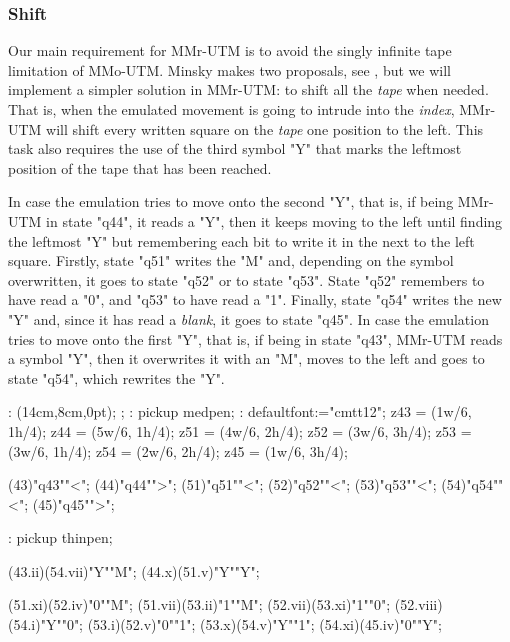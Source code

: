 \subsubsection{Shift}

Our main requirement for MMr-UTM is to avoid the
singly infinite tape limitation of MMo-UTM.
Minsky makes two proposals, see ,
but we will implement a simpler solution in MMr-UTM:
to shift all the {\em tape} when needed.
That is, when the emulated movement is going to intrude into
the {\em index}, MMr-UTM will shift every written square
on the {\em tape} one position to the left.
This task also requires the use of the third symbol "Y" that
marks the leftmost position of the tape that has been reached.

In case the emulation tries to move onto the second "Y",
that is, if being MMr-UTM in state "q44", it reads a "Y",
then it keeps moving to the left until finding the leftmost "Y"
but remembering each bit to write it in the next to the left square.
Firstly, state "q51" writes the "M" and,
depending on the symbol overwritten,
it goes to state "q52" or to state "q53".
State "q52" remembers to have read a "0",
and "q53" to have read a "1".
Finally, state "q54" writes the new "Y" and,
since it has read a {\em blank}, it goes to state "q45".
In case the emulation tries to move onto the first "Y",
that is, if being in state "q43", MMr-UTM reads a symbol "Y",
then it overwrites it with an "M", moves to the left
and goes to state "q54", which rewrites the "Y".

\MT:
\MTbeginfig(14cm,8cm,0pt);
\MTresetpa;
\MT: pickup medpen;
\MT: defaultfont:="cmtt12";
\MTcode
 z43 = (1w/6, 1h/4);
 z44 = (5w/6, 1h/4);
 z51 = (4w/6, 2h/4);
 z52 = (3w/6, 3h/4);
 z53 = (3w/6, 1h/4);
 z54 = (2w/6, 2h/4);
 z45 = (1w/6, 3h/4);

\MTstate(43)"q43""<";
\MTstate(44)"q44"">";
\MTstate(51)"q51""<";
\MTstate(52)"q52""<";
\MTstate(53)"q53""<";
\MTstate(54)"q54""<";
\MTstate(45)"q45"">";

\MT: pickup thinpen;

\MTinput(43.ii)(54.vii)"Y""M";
\MTinput(44.x)(51.v)"Y""Y";

\MTinput(51.xi)(52.iv)"0""M";
\MTinput(51.vii)(53.ii)"1""M";
\MTinput(52.vii)(53.xi)"1""0";
\MTinput(52.viii)(54.i)"Y""0";
\MTinput(53.i)(52.v)"0""1";
\MTinput(53.x)(54.v)"Y""1";
\MTinput(54.xi)(45.iv)"0""Y";

